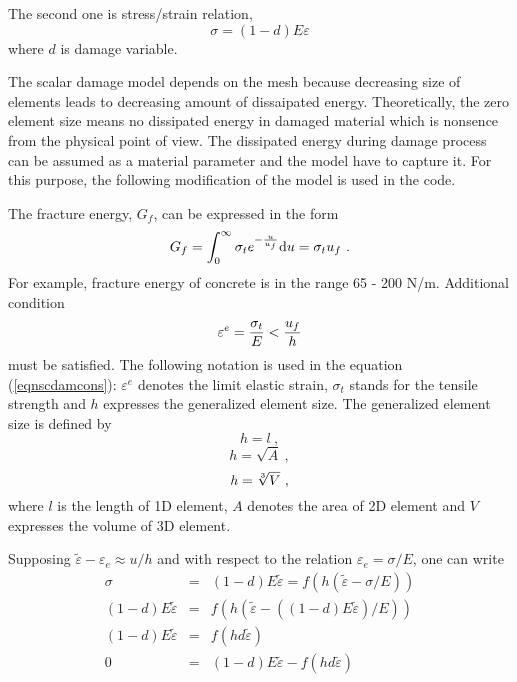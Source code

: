 The second one is stress/strain relation,
\begin{equation}
\sigma=(1 - d) E \varepsilon
\end{equation}
where $d$ is damage variable.

The scalar damage model depends on the mesh because decreasing size of elements leads to decreasing amount of
dissaipated energy. Theoretically, the zero element size means no dissipated energy in damaged material which is
nonsence from the physical point of view. The dissipated energy during damage process can be assumed as a material
parameter and the model have to capture it. For this purpose, the following modification of the model is used in the code.

The fracture  energy, $G_f$, can be expressed in the form
\begin{equation}
G_f = \int_0^{\infty} \sigma_t e^{-{u \over u_f}} {\rm d}u = \sigma_t u_f\ .
\end{equation}
For example, fracture energy of concrete is in the range 65 - 200 N/m. Additional condition
\begin{equation}\label{eqnscdamcons}
\varepsilon^{e} = \mbox{$\displaystyle\frac{\sigma_t}{E}$} < \mbox{$\displaystyle\frac{u_f}{h}$}
\end{equation}
must be satisfied. The following notation is used in the equation (\ref{eqnscdamcons}):
$\varepsilon^{e}$ denotes the limit elastic strain, $\sigma_t$ stands for the tensile strength and $h$
expresses the generalized element size. The generalized element size is defined by
\begin{equation}
h = l\ ,
\end{equation}
\begin{equation}
h = \sqrt{A}\ ,
\end{equation}
\begin{equation}
h = \root 3 \of {V}\ ,
\end{equation}
where $l$ is the length of 1D element, $A$ denotes the area of 2D element and $V$ expresses the volume of 3D element.

Supposing $\tilde{\varepsilon} - \varepsilon_e \approx u/h$ and with respect to the relation $\varepsilon_e = \sigma/E$, one can write
\begin{eqnarray}
\sigma&=&(1 - d) E \tilde{\varepsilon} = f(h(\tilde{\varepsilon}-\sigma/E))
\\
(1 - d) E \tilde{\varepsilon} &=& f(h(\tilde{\varepsilon}-((1-d) E \tilde{\varepsilon})/E))
\\
(1 - d) E \tilde{\varepsilon} &=& f(h d \tilde{\varepsilon})
\\
\label{eqnscdamparam}
0 &=& (1 - d) E \tilde{\varepsilon} - f(h d \tilde{\varepsilon})
\end{eqnarray}

